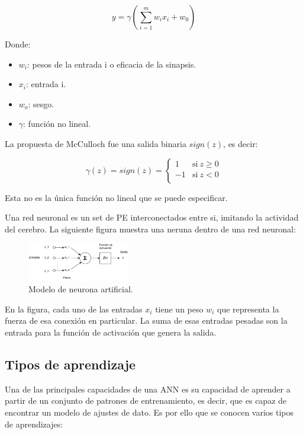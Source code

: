 $$ y = \gamma \left( \sum_{i = 1}^{m}w_ix_i + w_0 \right) $$

Donde:
\begin{itemize}
	\item $w_i$: pesos de la entrada i o eficacia de la sinapsis.
	\item $x_i$: entrada i.
	\item $w_o$: sesgo.
	\item $\gamma$: función no lineal.
\end{itemize}

La propuesta de McCulloch fue una salida binaria $sign(z)$, es decir:

$$ \gamma(z) = sign(z) = \left\{
	       \begin{array}{ll}
		 1      & \mathrm{si\ } z \ge 0 \\
		 -1	& \mathrm{si\ } z < 0  \\
	       \end{array}
	     \right. $$

Esta no es la única función no lineal que se puede especificar.

Una red neuronal es un set de PE interconectados entre si, imitando la
actividad del cerebro. La siguiente figura muestra una neruna dentro de una red
neuronal:

\begin{figure}[h!t]
    \begin{center}
        \includegraphics[width=0.4\textwidth]{images/ann_model}
        \caption{Modelo de neurona artificial.}
    \end{center}
\end{figure}

En la figura, cada uno de las entradas $x_i$ tiene un peso $w_i$ que representa
la fuerza de esa conexión en particular. La suma de esas entradas pesadas son
la entrada para la función de activación que genera la salida.

\subsection{Tipos de aprendizaje}

Una de las principales capacidades de una ANN es su capacidad de aprender a
partir de un conjunto de patrones de entrenamiento, es decir, que es capaz de
encontrar un modelo de ajustes de dato. Es por ello que se conocen varios tipos
de aprendizajes:

